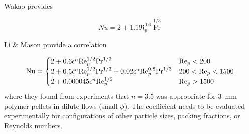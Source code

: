 












Wakao provides

\begin{equation}
	Nu = 2 + 1.1\Re_p^{0.6} \Pr^{1/3}
\end{equation}






Li \& Mason provide a correlation 

\begin{equation}
	\mathrm{Nu} = \begin{cases}
	2+ 0.6\epsilon^n\mathrm{Re}_p^{1/2}\mathrm{Pr}^{1/3} 										& \mathrm{Re}_p < 200\\
	2+ 0.5\epsilon^n\mathrm{Re}_p^{1/2}\mathrm{Pr}^{1/3} + 0.02 \epsilon^n \mathrm{Re}_p^{0.8}\mathrm{Pr}^{1/3} & 200 < \mathrm{Re}_p < 1500\\
	2+ 0.000045\epsilon^n\mathrm{Re}_p^{1/2}			 								& \mathrm{Re}_p > 1500
	\end{cases}
\end{equation}
where they found from experiments that $n=3.5$ was appropriate for 3~mm polymer pellets in dilute flows (small $\phi$). The coefficient needs to be evaluated experimentally for configurations of other particle sizes, packing fractions, or Reynolds numbers.\cite{Li2000}

